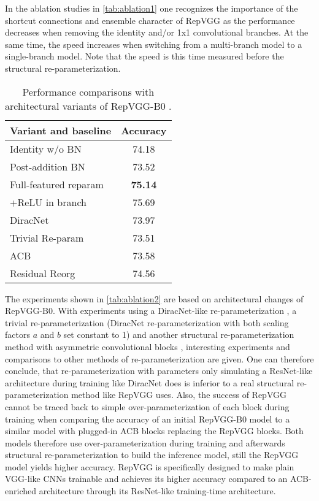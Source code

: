 In the ablation studies in \autoref{tab:ablation1} one recognizes the importance of the shortcut connections and ensemble character of RepVGG as the performance decreases when removing the identity and/or 1x1 convolutional branches. At the same time, the speed increases when switching from a multi-branch model to a single-branch model. Note that the speed is this time measured before the structural re-parameterization. 

\begin{table}
	\begin{center}
		\begin{tabular}{lc} 
			\hline
			Variant and baseline & Accuracy \\
			\hline
			Identity w/o BN & 74.18 \\
			Post-addition BN & 73.52 \\
			Full-featured reparam & \textbf{75.14} \\
			+ReLU in branch & 75.69 \\
			\hline
			DiracNet \cite{SergeyZagoruyko.2018} & 73.97 \\
			Trivial Re-param & 73.51 \\
			ACB \cite{XiaohanDing.2019} & 73.58 \\
			Residual Reorg & 74.56 \\
			\hline
		\end{tabular}
	\end{center}
	\caption{Performance comparisons with architectural variants of RepVGG-B0 \cite{XiaohanDing.2021}.}
	\label{tab:ablation2}
\end{table}

The experiments shown in \autoref{tab:ablation2} are based on architectural changes of RepVGG-B0. With experiments using a DiracNet-like re-parameterization \cite{SergeyZagoruyko.2018}, a trivial re-parameterization (DiracNet re-parameterization with both scaling factors $a$ and $b$ set constant to 1) and another structural re-parameterization method with asymmetric convolutional blocks \cite{XiaohanDing.2019}, interesting experiments and comparisons to other methods of re-parameterization are given. One can therefore conclude, that re-parameterization with parameters only simulating a ResNet-like architecture during training like DiracNet \cite{SergeyZagoruyko.2018} does is inferior to a real structural re-parameterization method like RepVGG uses. Also, the success of RepVGG cannot be traced back to simple over-parameterization of each block during training when comparing the accuracy of an initial RepVGG-B0 model to a similar model with plugged-in ACB blocks replacing the RepVGG blocks. Both models therefore use over-parameterization during training and afterwards structural re-parameterization to build the inference model, still the RepVGG model yields higher accuracy. RepVGG is specifically designed to make plain VGG-like CNNs trainable and achieves its higher accuracy compared to an ACB-enriched architecture through its ResNet-like training-time architecture. 

